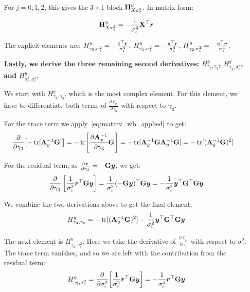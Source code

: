 For $j = 0, 1, 2$, this gives the $3 \times 1$ block $\mathbf{H}^y_{X\sigma_\varepsilon^2}$. In matrix form:
\begin{equation}
    \mathbf{H}^y_{X\sigma_\varepsilon^2} = -\frac{1}{\sigma_\varepsilon^4}\mathbf{X}^\top\bm{r}
\end{equation}

The explicit elements are: $H^y_{\gamma_0,\sigma_\varepsilon^2} = -\frac{\bm{1}^\top\bm{r}}{\sigma_\varepsilon^4}$, \; $H^y_{\gamma_1,\sigma_\varepsilon^2} = -\frac{\bm{s}^\top\bm{r}}{\sigma_\varepsilon^4}$, \; $H^y_{\gamma_2,\sigma_\varepsilon^2} = -\frac{\bm{c}^\top\bm{r}}{\sigma_\varepsilon^4}$.

\textbf{Lastly, we derive the three remaining second derivatives: $H^y_{\gamma_3,\gamma_3}$, $H^y_{\gamma_3,\sigma_\varepsilon^2}$, and $H^y_{\sigma_\varepsilon^2,\sigma_\varepsilon^2}$}.

We start with $H^y_{\gamma_3,\gamma_3}$, which is the most complex element. For this element, we have to differentiate both terms of $\frac{\partial \ell_y}{\partial \gamma_3}$ with respect to $\gamma_3$.

For the trace term we apply~\eqref{eq:matinv_wb_applied} to get:
\begin{align}
    \frac{\partial}{\partial \gamma_3}\bigl[-\operatorname{tr}[\mathbf{A}_y^{-1}\mathbf{G}]\bigr]
    &= -\operatorname{tr}\!\left[\frac{\partial \mathbf{A}_y^{-1}}{\partial \gamma_3}\mathbf{G}\right]
    = -\operatorname{tr}[\mathbf{A}_y^{-1}\mathbf{G}\mathbf{A}_y^{-1}\mathbf{G}]
    = -\operatorname{tr}[(\mathbf{A}_y^{-1}\mathbf{G})^2]
\end{align}

For the residual term, as $\frac{\partial \bm{r}}{\partial \gamma_3} = -\mathbf{G}\bm{y}$, we get:
\begin{align}
    \frac{\partial}{\partial \gamma_3}\left[\frac{1}{\sigma_\varepsilon^2}\bm{r}^\top\mathbf{G}\bm{y}\right]
    = \frac{1}{\sigma_\varepsilon^2}(-\mathbf{G}\bm{y})^\top\mathbf{G}\bm{y}
    = -\frac{1}{\sigma_\varepsilon^2}\bm{y}^\top\mathbf{G}^\top\mathbf{G}\bm{y}
\end{align}

We combine the two derivations above to get the final element:
\begin{equation}
\label{eq:Hg3g3}
    H^y_{\gamma_3,\gamma_3} = -\operatorname{tr}[(\mathbf{A}_y^{-1}\mathbf{G})^2]
    - \frac{1}{\sigma_\varepsilon^2}\bm{y}^\top\mathbf{G}^\top\mathbf{G}\bm{y}
\end{equation}

The next element is $H^y_{\gamma_3,\sigma_\varepsilon^2}$. Here we take the derivative of $\frac{\partial \ell_y}{\partial \gamma_3}$ with respect to $\sigma_\varepsilon^2$. The trace term vanishes, and so we are left with the contribution from the residual term:
\begin{equation}
    H^y_{\gamma_3,\sigma_\varepsilon^2} = \frac{\partial}{\partial \sigma_\varepsilon^2}\!\left[\frac{1}{\sigma_\varepsilon^2}\bm{r}^\top\mathbf{G}\bm{y}\right] = -\frac{1}{\sigma_\varepsilon^4}\bm{r}^\top\mathbf{G}\bm{y}
\end{equation}

